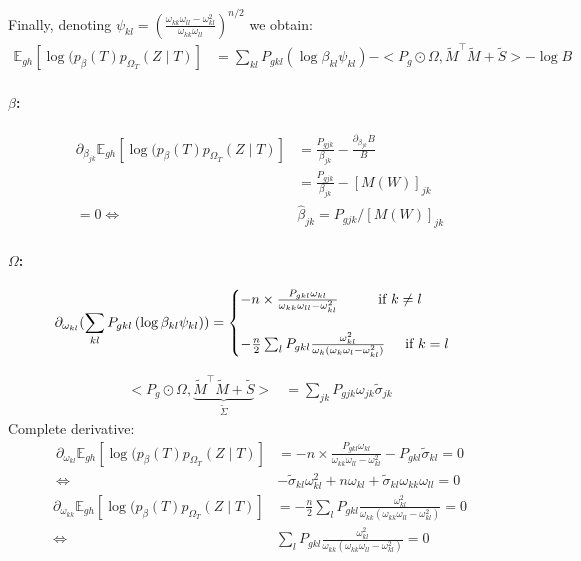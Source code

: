 \documentclass[11pt,a4paper]{article}
\newcommand{\Esp}{\mathds{E}}
\begin{document}
Finally, denoting $\psi_{kl} = \left(\frac{\omega_{kk}\omega_{ll}-\omega_{kl}^2}{\omega_{kk}\omega_{ll}}\right)^{n/2}$ we obtain:
\begin{align*}
\Esp_{gh} [\log (p_\beta(T)p_{\Omega_T}(Z\mid T) ] &=\sum_{kl} P_{gkl} \left(\log  \beta_{kl}\psi_{kl}\right) - <P_g \odot \Omega, \widetilde{M}^\intercal \widetilde{M} + \widetilde{S}>- \log B
\end{align*}
\paragraph{$\beta$:}
\begin{align*}
\partial_{\beta_{jk}} \Esp_{gh} [\log (p_\beta(T)p_{\Omega_T}(Z\mid T) ] &= \frac{P_{gjk}}{\beta_{jk}} - \frac{\partial_{\beta_{jk}} B }{B}\\
&=\frac{P_{gjk}}{\beta_{jk}}  - [M(W)]_{jk}\\
=0 \iff &\widehat{\beta}_{jk} = P_{gjk} / [M(W)]_{jk}
\end{align*}
\paragraph{$\Omega$:}

\[
 \partial_{\omega_{kl}}(\sum_{kl} P_{gkl} \left(\log  \beta_{kl}\psi_{kl}\right))=\begin{cases}
               -n\times \frac{P_{gkl} \omega_{kl}}{\omega_{kk}\omega_{ll}-\omega_{kl}^2} \text{\hspace{1cm}if $k\neq l$}\\\\
              -\frac{n}{2} \sum_l P_{gkl} \frac{\omega_{kl}^2}{\omega_k(\omega_k\omega_l-\omega_{kl}^2)}\text{\hspace{0.5cm}if $k = l$}
            \end{cases}
\]

\begin{align*}
 <P_g \odot \Omega, \underbrace{\widetilde{M}^\intercal \widetilde{M} + \widetilde{S}}_{\widetilde{\Sigma}}> &=\sum_{jk}P_{gjk} \omega_{jk} \widetilde{\sigma}_{jk}
\end{align*}
Complete derivative:
\begin{align*}
 \partial_{\omega_{kl}}\Esp_{gh} [\log (p_\beta(T)p_{\Omega_T}(Z\mid T) ] &=-n\times \frac{P_{gkl} \omega_{kl}}{\omega_{kk}\omega_{ll}-\omega_{kl}^2}  -  P_{gkl}\widetilde{\sigma}_{kl} =0\\
 \iff & -\widetilde{\sigma}_{kl} \omega_{kl}^2 + n \omega_{kl} + \widetilde{\sigma}_{kl}\omega_{kk}\omega_{ll}=0
\end{align*}
\begin{align*}
 \partial_{\omega_{kk}}\Esp_{gh} [\log (p_\beta(T)p_{\Omega_T}(Z\mid T) ] &= -\frac{n}{2} \sum_l P_{gkl} \frac{\omega_{kl}^2}{\omega_{kk}(\omega_{kk}\omega_{ll}-\omega_{kl}^2)} =0\\
 \iff & \sum_l P_{gkl} \frac{\omega_{kl}^2}{\omega_{kk}(\omega_{kk}\omega_{ll}-\omega_{kl}^2)} =0
\end{align*}
\end{document}
